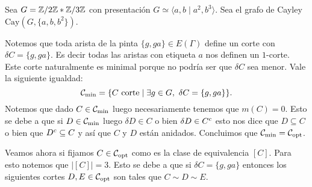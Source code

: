 \documentclass[tesis.tex]{subfiles}
\begin{document}
\begin{ej}
	Sea $G = \mathbb{Z} / 2\mathbb{Z} \ast \mathbb{Z} / 3\mathbb{Z} $ con presentación $G \simeq \langle a,b \mid a^2, b^3 \rangle$.
	Sea el grafo de Cayley  $\text{Cay}(G, \{a,b,b^2\})$.
	
	Notemos que toda arista de la pinta $\{g,ga\} \in E(\Gamma)$ define un corte con $\delta C = \{g,ga\}$.
	Es decir todas las aristas con etiqueta $a$ nos definen un $1$-corte.
	Este corte naturalmente es minimal porque no podría ser que $\delta C$ sea menor. Vale la siguiente igualdad:
	\[
	{\cal C}_{\text{min}} = \{ C \ \text{corte}  \mid \exists g \in G, \ \delta C = \{g,ga\}  \}. 
	\]
	Notemos que dado $C \in {\cal C}_{\text{min}}$ luego necesariamente tenemos que $m(C) = 0$. 
	Esto se debe a que si $D \in {\cal C}_{\text{min}}$ luego $\delta D \in C$ o bien $\delta D \in C^{c}$ esto nos dice que $D \subseteq C$ o bien que $D^{c} \subseteq C$ y así que $C$ y $D$ están anidados.
	Concluimos que ${\cal C}_{\text{min}} = {\cal C}_{\text{opt}}$.
	
	Veamos ahora si fijamos $C \in {\cal C}_{\text{opt}}$ como es la clase de equivalencia $[C]$.
	Para esto notemos que $|[C]| = 3.$
	Esto se debe a que si $\delta C = \{ g,ga \}$ entonces los siguientes cortes $D,E \in {\cal C}_{\text{opt}}$ son tales que $C \sim D \sim E$.
	
	\begin{figure}[H]
		\centering
\end{figure}
\end{ej}
\end{document}
